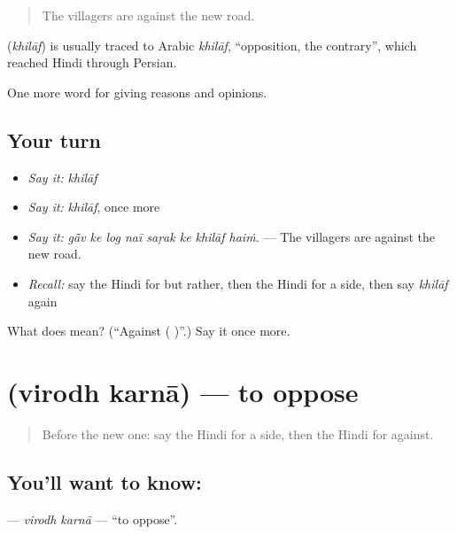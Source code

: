 \begin{quote}
The villagers are against the new road.
\end{quote}

\begin{cousinweb}
\textbf{} (\emph{khilāf}) is usually traced to Arabic \emph{khilāf}, \textquotedblleft{}opposition, the contrary\textquotedblright{}, which reached Hindi through Persian.
\end{cousinweb}

\begin{grammarlens}[title={What you've built}]
One more word for giving reasons and opinions.
\end{grammarlens}

\subsection*{Your turn}
\begin{itemize}
\raggedright
  \item \emph{Say it:} \emph{khilāf}
  \item \emph{Say it:} \emph{khilāf}, once more
  \item \emph{Say it:} \emph{gā̃v ke log naī saṛak ke khilāf haiṁ.} — The villagers are against the new road.
  \item \emph{Recall:} say the Hindi for but rather, then the Hindi for a side, then say \emph{khilāf} again
\end{itemize}

\begin{tcolorbox}[breakable,colback=teal!4,colframe=teal!35!black,title={Before you move on}]
What does  mean? (\textquotedblleft{}Against ( )\textquotedblright{}.) Say it once more.
\end{tcolorbox}
\section[\texorpdfstring{\hi{विरोध} \hi{करना} (virodh karnā)}{विरोध करना (virodh karnā)}]{  (virodh karnā) — to oppose}

\label{lesson:HI-C347-virodhkarna}



\begin{quote}
Before the new one: say the Hindi for a side, then the Hindi for against.
\end{quote}

\subsection*{You'll want to know:  }
\textbf{ } — \emph{virodh karnā} — \textquotedblleft{}to oppose\textquotedblright{}.

